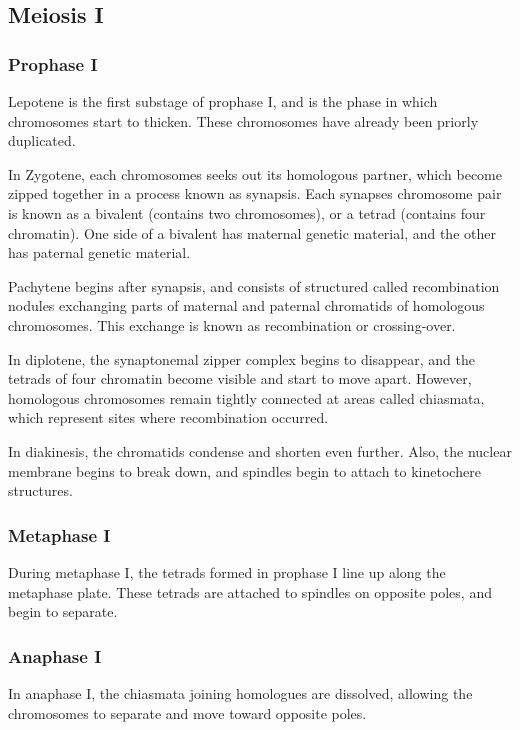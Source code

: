 \documentclass[12pt,titlepage]{article}
\begin{document}
    \subsection{Meiosis I}

      \subsubsection{Prophase I}
        Lepotene is the first substage of prophase I, and is the phase in which chromosomes start to thicken. These chromosomes have already been priorly duplicated.

        In Zygotene, each chromosomes seeks out its homologous partner, which become zipped together in a process known as synapsis. Each synapses chromosome pair is known
        as a bivalent (contains two chromosomes), or a tetrad (contains four chromatin). One side of a bivalent has maternal genetic material, and the other has paternal
        genetic material.

        Pachytene begins after synapsis, and consists of structured called recombination nodules exchanging parts of maternal and paternal chromatids of homologous chromosomes.
        This exchange is known as recombination or crossing-over.

        In diplotene, the synaptonemal zipper complex begins to disappear, and the tetrads of four chromatin become visible and start to move apart. However, homologous
        chromosomes remain tightly connected at areas called chiasmata, which represent sites where recombination occurred.

        In diakinesis, the chromatids condense and shorten even further. Also, the nuclear membrane begins to break down, and spindles begin to attach to kinetochere structures.

      \subsubsection{Metaphase I}
        During metaphase I, the tetrads formed in prophase I line up along the metaphase plate. These tetrads are attached to spindles on opposite poles, and begin to separate.

      \subsubsection{Anaphase I}
        In anaphase I, the chiasmata joining homologues are dissolved, allowing the chromosomes to separate and move toward opposite poles.
\end{document}
